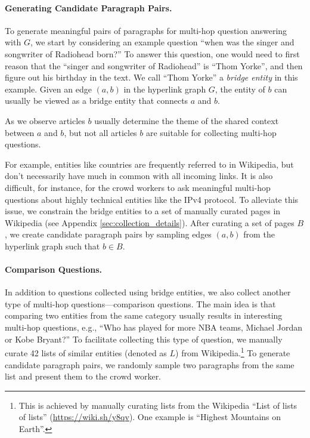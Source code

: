 \paragraph{Generating Candidate Paragraph Pairs.} To generate meaningful pairs of paragraphs for multi-hop question answering with $G$, we start by considering an example question ``when was the singer and songwriter of Radiohead born?'' To answer this question, one would need to first reason that the ``singer and songwriter of Radiohead'' is ``Thom Yorke'', and then figure out his birthday in the text. We call ``Thom Yorke'' a \emph{bridge entity} in this example. Given an edge $(a, b)$ in the hyperlink graph $G$, the entity of $b$ can usually be viewed as a bridge entity that connects $a$ and $b$.

As we observe articles $b$ usually determine the theme of the shared context between $a$ and $b$, but not all articles $b$ are suitable for collecting multi-hop questions.

For example, entities like countries are frequently referred to in Wikipedia, but don't necessarily have much in common with all incoming links. It is also difficult, for instance, for the crowd workers to ask meaningful multi-hop questions about highly technical entities like the IPv4 protocol. To alleviate this issue, we constrain the bridge entities to a set of manually curated pages in Wikipedia (see Appendix \ref{sec:collection_details}).
After curating a set of pages $B$, we create candidate paragraph pairs by sampling edges $(a, b)$ from the hyperlink graph such that $b \in B$.

\paragraph{Comparison Questions.} In addition to questions collected using bridge entities, we also collect another type of multi-hop questions---comparison questions. The main idea is that comparing two entities from the same category usually results in interesting multi-hop questions, e.g., ``Who has played for more NBA teams, Michael Jordan or Kobe Bryant?'' To facilitate collecting this type of question, we manually curate 42 lists of similar entities (denoted as $L$) from Wikipedia.\footnote{This is achieved by manually curating lists from the Wikipedia ``List of lists of lists'' (\url{https://wiki.sh/y8qv}). One example is ``Highest Mountains on Earth''.} To generate candidate paragraph pairs, we randomly sample two paragraphs from the same list and present them to the crowd worker.

